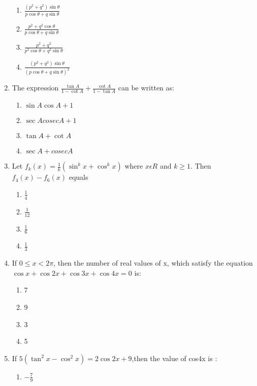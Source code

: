\begin{enumerate}[label=\arabic*.,ref=\thesubsection.\theenumi]
    \begin{enumerate}
        \item ${\frac{(p^2+q^2)\sin\theta}{p\cos\theta + q\sin \theta}}$\\
        \item ${\frac{p^2 + q^2\cos \theta}{p\cos \theta + q\sin \theta}}$\\
        \item ${\frac{p^2 + q^2}{p^2\cos \theta + q^2\sin \theta}}$\\
        \item ${\frac{(p^2 + q^2)\sin \theta}{(p \cos \theta + q \sin \theta)^2}}$\\
    \end{enumerate}
    \item The expression $\frac{\tan{A}}{1- \cot{A}}+\frac{\cot{A}}{1-\tan{A}}$ can be written as:
    \begin{enumerate}
        \item $\sin A \cos A + 1$
        \item $\sec{A} cosec A+ 1$
        \item $\tan{A} + \cot{A}$
        \item $\sec{A} + cosec A$
    \end{enumerate}
    \item Let $f_k(x) = {\frac{1}{k}}(\sin^k x+ \cos^k x)$ where $x\epsilon R$ and $k\geq 1$. Then $f_4(x) - f_6(x)$ equals
    \begin{enumerate}
        \item {$\frac{1}{4}$}
        \item {$\frac{1}{12}$}
        \item {$\frac{1}{6}$}
        \item {$\frac{1}{3}$}
    \end{enumerate}
    \item If $0\leq x < 2\pi$, then the number of real values of x, which satisfy the equation $\cos x+\cos 2x+ \cos 3x+\cos 4x =0$ is:
    \begin{enumerate}
    \item 7
    \item 9
    \item 3
    \item 5
    \end{enumerate}
    \item If $5(\tan^2x-\cos^2 x) = 2\cos2x + 9$,then the value of cos4x is :
    \begin{enumerate}
        \item {$-\frac{7}{9}$}

\end{enumerate}
\end{enumerate}

